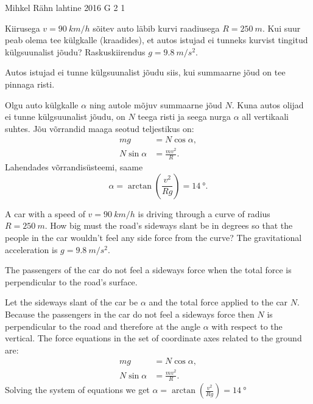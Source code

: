 {Mihkel Rähn} %
{lahtine} %
{2016} %
{G 2} %
{1} %
{
\ifStatement
Kiirusega $v=\SI{90}{km/h}$ sõitev auto läbib kurvi raadiusega $R=\SI{250}{m}$. Kui suur peab olema tee külgkalle (kraadides), et autos istujad ei tunneks kurvist tingitud külgsuunalist jõudu? Raskuskiirendus $g=\SI{9.8}{m/s^{2}}$.
\fi


\ifHint
Autos istujad ei tunne külgsuunalist jõudu siis, kui summaarne jõud on tee pinnaga risti.
\fi


\ifSolution
Olgu auto külgkalle $\alpha$ ning autole mõjuv summaarne jõud $N$. Kuna autos olijad ei tunne külgsuunalist jõudu, on $N$ teega risti ja seega nurga $\alpha$ all vertikaali suhtes. Jõu võrrandid maaga seotud teljestikus on:
\begin{align*}
mg &= N\cos \alpha,\\
N\sin\alpha &= \frac{mv^2}{R}.
\end{align*}
Lahendades võrrandisüsteemi, saame
\[
\alpha = \arctan\left(\frac{v^2}{Rg}\right) = \SI{14}{\degree}.
\]
\fi


\ifEngStatement
A car with a speed of $v=\SI{90}{km/h}$ is driving through a curve of radius $R=\SI{250}{m}$. How big must the road’s sideways slant be in degrees so that the people in the car wouldn’t feel any side force from the curve? The gravitational acceleration is $g=\SI{9.8}{m/s^{2}}$.
\fi


\ifEngHint
The passengers of the car do not feel a sideways force when the total force is perpendicular to the road’s surface.
\fi


\ifEngSolution
Let the sideways slant of the car be $\alpha$ and the total force applied to the car $N$. Because the passengers in the car do not feel a sideways force then $N$ is perpendicular to the road and therefore at the angle $\alpha$ with respect to the vertical. The force equations in the set of coordinate axes related to the ground are: 
\begin{align*}
mg &= N\cos \alpha,\\
N\sin\alpha &= \frac{mv^2}{R}.
\end{align*}
Solving the system of equations we get $\alpha = \arctan(\frac{v^2}{Rg}) = \SI{14}{\degree}$
\fi
}